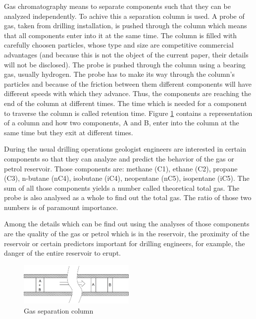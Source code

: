 \documentclass[conference]{IEEEtran}
\begin{document}
    Gas chromatography means to separate components such that they can be analyzed independently. To achive this a
    separation column is used. A probe of gas, taken from drilling installation, is pushed through the column which
    means that all components enter into it at the same time. The column is filled with carefully choosen particles,
    whose type and size are competitive commercial advantages (and because this is not the object of the current paper,
    their details will not be disclosed). The probe is pushed through the column using a bearing gas, usually hydrogen.
    The probe has to make its way through the column's particles and because of the friction between them different
    components will have different speeds with which they advance. Thus, the components are reaching the end of the 
    column at different times. The time which is needed for a component to traverse the column is called retention time.
    Figure \ref{fig:column} contains a representation of a column and how two components, A and B, enter into the column at the same
    time but they exit at different times.
    
    During the usual drilling operations geologist engineers are interested in certain components so that they can analyze
    and predict the behavior of the gas or petrol reservoir. Those components are: methane (C1), ethane (C2), propane (C3),
    n-butane (nC4), isobutane (iC4), neopentane (nC5), isopentane (iC5). The sum of all those components yields a number
    called theoretical total gas. The probe is also analysed as a whole to find out the total gas. The ratio of those two
    numbers is of paramount importance.
    
    Among the details which can be find out using the analyses of those components are the quality of the gas or petrol
    which is in the reservoir, the proximity of the reservoir or certain predictors important for drilling engineers, for
    example, the danger of the entire reservoir to erupt.

    \begin{figure}
        \centering
        \includegraphics[width=0.5\textwidth]{column.png}
        \caption{Gas separation column}
        \label{fig:column}
    \end{figure}
\end{document}
